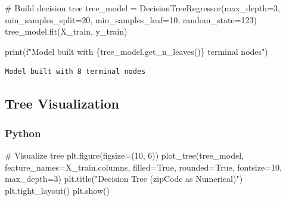 \documentclass[
  letterpaper,
  DIV=11,
  numbers=noendperiod]{scrartcl}
\newenvironment{Shaded}{\begin{snugshade}}{\end{snugshade}}
\newcommand{\BuiltInTok}[1]{\textcolor[rgb]{0.00,0.23,0.31}{#1}}
\newcommand{\CommentTok}[1]{\textcolor[rgb]{0.37,0.37,0.37}{#1}}
\newcommand{\DecValTok}[1]{\textcolor[rgb]{0.68,0.00,0.00}{#1}}
\newcommand{\NormalTok}[1]{\textcolor[rgb]{0.00,0.23,0.31}{#1}}
\newcommand{\OperatorTok}[1]{\textcolor[rgb]{0.37,0.37,0.37}{#1}}
\newcommand{\SpecialCharTok}[1]{\textcolor[rgb]{0.37,0.37,0.37}{#1}}
\newcommand{\SpecialStringTok}[1]{\textcolor[rgb]{0.13,0.47,0.30}{#1}}
\newcommand{\StringTok}[1]{\textcolor[rgb]{0.13,0.47,0.30}{#1}}
\newcommand{\VariableTok}[1]{\textcolor[rgb]{0.07,0.07,0.07}{#1}}
\begin{document}
\begin{Shaded}
\begin{Highlighting}[]
\CommentTok{\# Build decision tree}
\NormalTok{tree\_model }\OperatorTok{=}\NormalTok{ DecisionTreeRegressor(max\_depth}\OperatorTok{=}\DecValTok{3}\NormalTok{, }
\NormalTok{                                  min\_samples\_split}\OperatorTok{=}\DecValTok{20}\NormalTok{, }
\NormalTok{                                  min\_samples\_leaf}\OperatorTok{=}\DecValTok{10}\NormalTok{, }
\NormalTok{                                  random\_state}\OperatorTok{=}\DecValTok{123}\NormalTok{)}
\NormalTok{tree\_model.fit(X\_train, y\_train)}

\BuiltInTok{print}\NormalTok{(}\SpecialStringTok{f"Model built with }\SpecialCharTok{\{}\NormalTok{tree\_model}\SpecialCharTok{.}\NormalTok{get\_n\_leaves()}\SpecialCharTok{\}}\SpecialStringTok{ terminal nodes"}\NormalTok{)}
\end{Highlighting}
\end{Shaded}

\begin{verbatim}
Model built with 8 terminal nodes
\end{verbatim}

\subsection{Tree Visualization}\label{tree-visualization}

\subsubsection{Python}\label{python-1}

\begin{Shaded}
\begin{Highlighting}[]
\CommentTok{\# Visualize tree}
\NormalTok{plt.figure(figsize}\OperatorTok{=}\NormalTok{(}\DecValTok{10}\NormalTok{, }\DecValTok{6}\NormalTok{))}
\NormalTok{plot\_tree(tree\_model, }
\NormalTok{          feature\_names}\OperatorTok{=}\NormalTok{X\_train.columns,}
\NormalTok{          filled}\OperatorTok{=}\VariableTok{True}\NormalTok{, }
\NormalTok{          rounded}\OperatorTok{=}\VariableTok{True}\NormalTok{,}
\NormalTok{          fontsize}\OperatorTok{=}\DecValTok{10}\NormalTok{,}
\NormalTok{          max\_depth}\OperatorTok{=}\DecValTok{3}\NormalTok{)}
\NormalTok{plt.title(}\StringTok{"Decision Tree (zipCode as Numerical)"}\NormalTok{)}
\NormalTok{plt.tight\_layout()}
\NormalTok{plt.show()}
\end{Highlighting}
\end{Shaded}
\end{document}
